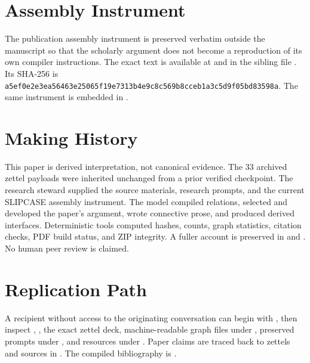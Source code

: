 \documentclass[11pt]{article}
\begin{document}
\printbibliography



\clearpage
\appendix
\sloppy
\section{Assembly Instrument}
The publication assembly instrument is preserved verbatim outside the manuscript so that the scholarly argument does not become a reproduction of its own compiler instructions. The exact text is available at  and in the sibling file . Its SHA-256 is \texttt{a5ef0e2e3ea56463e25065f19e7313b4}\linebreak\texttt{e9c8c569b8cceb1a3c5d9f05bd83598a}. The same instrument is embedded in .

\section{Making History}
This paper is derived interpretation, not canonical evidence. The 33 archived zettel payloads were inherited unchanged from a prior verified checkpoint. The research steward supplied the source materials, research prompts, and the current SLIPCASE assembly instrument. The model compiled relations, selected and developed the paper's argument, wrote connective prose, and produced derived interfaces. Deterministic tools computed hashes, counts, graph statistics, citation checks, PDF build status, and ZIP integrity. A fuller account is preserved in  and . No human peer review is claimed.

\section{Replication Path}
A recipient without access to the originating conversation can begin with , then inspect , , the exact zettel deck, machine-readable graph files under , preserved prompts under , and resources under . Paper claims are traced back to zettels and sources in . The compiled bibliography is .
\end{document}
